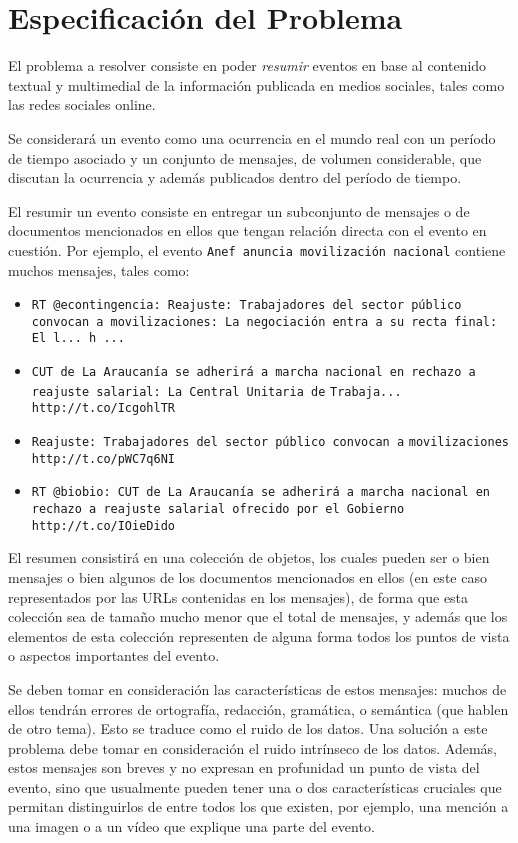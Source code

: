 \chapter{Especificación del Problema}
\label{sec-3}


  El problema a resolver consiste en poder \emph{resumir} eventos en base
  al contenido textual y multimedial de la información publicada en
  medios sociales, tales como las redes sociales online.

  Se considerará un evento como una ocurrencia en el mundo real
  con un período de tiempo asociado y un conjunto de mensajes, de
  volumen considerable, que discutan la ocurrencia y además publicados
  dentro del período de tiempo.

  El resumir un evento consiste en entregar un subconjunto de
  mensajes o de documentos mencionados en ellos que tengan
  relación directa con el evento en cuestión. Por ejemplo, el evento
  \texttt{Anef anuncia movilización nacional} contiene muchos mensajes, tales
  como:
\begin{itemize}
\item \texttt{RT @econtingencia: Reajuste: Trabajadores del sector público}
    \texttt{convocan a movilizaciones: La negociación entra a su recta final:}
    \texttt{El l... h ...}
\item \texttt{CUT de La Araucanía se adherirá a marcha nacional en rechazo a}
    \texttt{reajuste salarial: La Central Unitaria de}
    \texttt{Trabaja... http://t.co/IcgohlTR}
\item \texttt{Reajuste: Trabajadores del sector público convocan a}
    \texttt{movilizaciones http://t.co/pWC7q6NI}
\item \texttt{RT @biobio: CUT de La Araucanía se adherirá a marcha nacional en}
    \texttt{rechazo a reajuste salarial ofrecido por el Gobierno}
    \texttt{http://t.co/IOieDido}
\end{itemize}
  El resumen consistirá en una colección de objetos, los cuales pueden
  ser o bien mensajes o bien algunos de los documentos mencionados en
  ellos (en este caso representados por las URLs contenidas en los
  mensajes), de forma que esta colección sea de tamaño mucho menor que
  el total de mensajes, y además que los elementos de esta colección
  representen de alguna forma todos los puntos de vista o aspectos
  importantes del evento.

  Se deben tomar en consideración las características de estos
  mensajes: muchos de ellos tendrán errores de ortografía, redacción,
  gramática, o semántica (que hablen de otro tema). Esto se traduce
  como el ruido de los datos. Una solución a este problema debe tomar
  en consideración el ruido intrínseco de los datos. Además, estos
  mensajes son breves y no expresan en profunidad un punto de vista
  del evento, sino que usualmente pueden tener una o dos
  características cruciales que permitan distinguirlos de entre todos
  los que existen, por ejemplo, una mención a una imagen o a un
  vídeo que explique una parte del evento.
